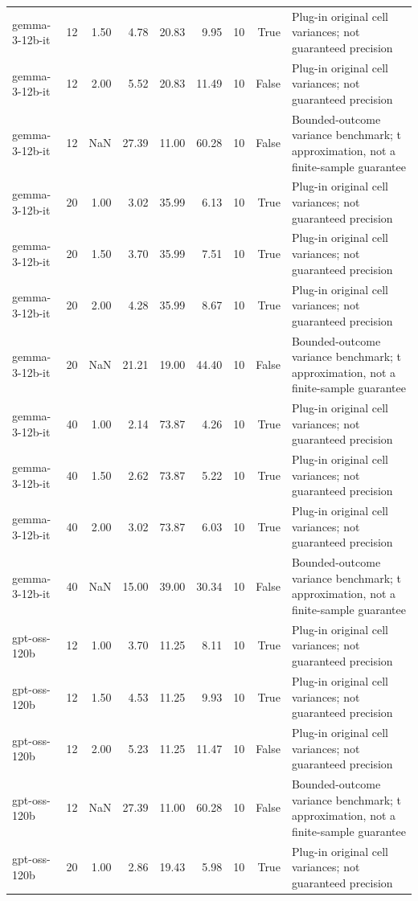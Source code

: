 \begin{tabular}{lrrrrrrrl}
gemma-3-12b-it & 12 & 1.50 & 4.78 & 20.83 & 9.95 & 10 & True & Plug-in original cell variances; not guaranteed precision \\
gemma-3-12b-it & 12 & 2.00 & 5.52 & 20.83 & 11.49 & 10 & False & Plug-in original cell variances; not guaranteed precision \\
gemma-3-12b-it & 12 & NaN & 27.39 & 11.00 & 60.28 & 10 & False & Bounded-outcome variance benchmark; t approximation, not a finite-sample guarantee \\
gemma-3-12b-it & 20 & 1.00 & 3.02 & 35.99 & 6.13 & 10 & True & Plug-in original cell variances; not guaranteed precision \\
gemma-3-12b-it & 20 & 1.50 & 3.70 & 35.99 & 7.51 & 10 & True & Plug-in original cell variances; not guaranteed precision \\
gemma-3-12b-it & 20 & 2.00 & 4.28 & 35.99 & 8.67 & 10 & True & Plug-in original cell variances; not guaranteed precision \\
gemma-3-12b-it & 20 & NaN & 21.21 & 19.00 & 44.40 & 10 & False & Bounded-outcome variance benchmark; t approximation, not a finite-sample guarantee \\
gemma-3-12b-it & 40 & 1.00 & 2.14 & 73.87 & 4.26 & 10 & True & Plug-in original cell variances; not guaranteed precision \\
gemma-3-12b-it & 40 & 1.50 & 2.62 & 73.87 & 5.22 & 10 & True & Plug-in original cell variances; not guaranteed precision \\
gemma-3-12b-it & 40 & 2.00 & 3.02 & 73.87 & 6.03 & 10 & True & Plug-in original cell variances; not guaranteed precision \\
gemma-3-12b-it & 40 & NaN & 15.00 & 39.00 & 30.34 & 10 & False & Bounded-outcome variance benchmark; t approximation, not a finite-sample guarantee \\
gpt-oss-120b & 12 & 1.00 & 3.70 & 11.25 & 8.11 & 10 & True & Plug-in original cell variances; not guaranteed precision \\
gpt-oss-120b & 12 & 1.50 & 4.53 & 11.25 & 9.93 & 10 & True & Plug-in original cell variances; not guaranteed precision \\
gpt-oss-120b & 12 & 2.00 & 5.23 & 11.25 & 11.47 & 10 & False & Plug-in original cell variances; not guaranteed precision \\
gpt-oss-120b & 12 & NaN & 27.39 & 11.00 & 60.28 & 10 & False & Bounded-outcome variance benchmark; t approximation, not a finite-sample guarantee \\
gpt-oss-120b & 20 & 1.00 & 2.86 & 19.43 & 5.98 & 10 & True & Plug-in original cell variances; not guaranteed precision \\

\end{tabular}
